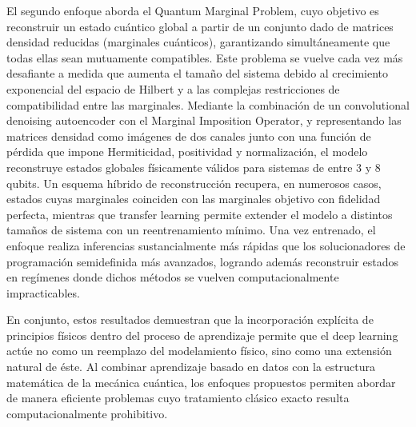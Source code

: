 El segundo enfoque aborda el Quantum Marginal Problem, cuyo objetivo es reconstruir un estado cuántico global a partir de un conjunto dado de matrices densidad reducidas (marginales cuánticos), garantizando simultáneamente que todas ellas sean mutuamente compatibles. Este problema se vuelve cada vez más desafiante a medida que aumenta el tamaño del sistema debido al crecimiento exponencial del espacio de Hilbert y a las complejas restricciones de compatibilidad entre las marginales. Mediante la combinación de un convolutional denoising autoencoder con el Marginal Imposition Operator, y representando las matrices densidad como imágenes de dos canales junto con una función de pérdida que impone Hermiticidad, positividad y normalización, el modelo reconstruye estados globales físicamente válidos para sistemas de entre 3 y 8 qubits. Un esquema híbrido de reconstrucción recupera, en numerosos casos, estados cuyas marginales coinciden con las marginales objetivo con fidelidad perfecta, mientras que transfer learning permite extender el modelo a distintos tamaños de sistema con un reentrenamiento mínimo. Una vez entrenado, el enfoque realiza inferencias sustancialmente más rápidas que los solucionadores de programación semidefinida más avanzados, logrando además reconstruir estados en regímenes donde dichos métodos se vuelven computacionalmente impracticables.

En conjunto, estos resultados demuestran que la incorporación explícita de principios físicos dentro del proceso de aprendizaje permite que el deep learning actúe no como un reemplazo del modelamiento físico, sino como una extensión natural de éste. Al combinar aprendizaje basado en datos con la estructura matemática de la mecánica cuántica, los enfoques propuestos permiten abordar de manera eficiente problemas cuyo tratamiento clásico exacto resulta computacionalmente prohibitivo.